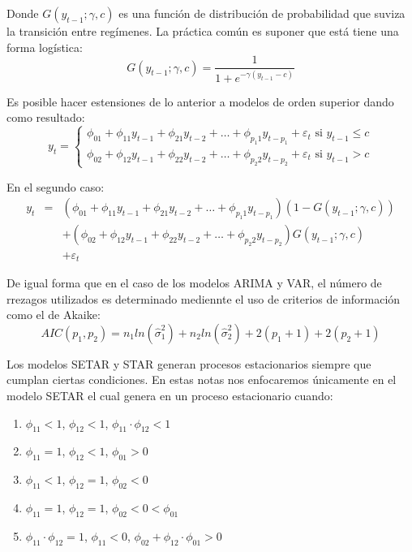 \documentclass[
]{book}
\begin{document}
Donde \(G(y_{t-1}; \gamma, c)\) es una función de distribución de probabilidad que suviza la transición entre regímenes. La práctica común es suponer que está tiene una forma logística:
\begin{equation}
    G(y_{t-1}; \gamma, c) = \frac{1}{1 + e^{-\gamma (y_{t-1} - c)}}
\end{equation}

Es posible hacer estensiones de lo anterior a modelos de orden superior dando como resultado:
\begin{equation}
    y_t = 
    \begin{cases}
        \phi_{01} + \phi_{11} y_{t-1} + \phi_{21} y_{t-2} + \ldots + \phi_{p_1 1} y_{t-p_1} + \varepsilon_t \text{ si } y_{t-1} \leq c \\
        \phi_{02} + \phi_{12} y_{t-1} + \phi_{22} y_{t-2} + \ldots + \phi_{p_2 2} y_{t-p_2} + \varepsilon_t \text{ si } y_{t-1} > c 
    \end{cases}
\end{equation}

En el segundo caso:
\begin{eqnarray*}
    y_t & = & (\phi_{01} + \phi_{11} y_{t-1} + \phi_{21} y_{t-2} + \ldots + \phi_{p_1 1} y_{t-p_1}) (1 - G(y_{t-1}; \gamma, c)) \\
    &  & + (\phi_{02} + \phi_{12} y_{t-1} + \phi_{22} y_{t-2} + \ldots + \phi_{p_2 2} y_{t-p_2}) G(y_{t-1}; \gamma, c) \\
    &  & + \varepsilon_t
\end{eqnarray*}

De igual forma que en el caso de los modelos ARIMA y VAR, el número de rrezagos utilizados es determinado mediennte el uso de criterios de información como el de Akaike:
\begin{equation}
    AIC(p_1, p_2) = n_1 ln(\hat{\sigma}^2_1) + n_2 ln(\hat{\sigma}^2_2) + 2(p_1 + 1) + 2(p_2 + 1)
\end{equation}

Los modelos SETAR y STAR generan procesos estacionarios siempre que cumplan ciertas condiciones. En estas notas nos enfocaremos únicamente en el modelo SETAR el cual genera en un proceso estacionario cuando:

\begin{enumerate}
    \item $\phi_{11} < 1$, $\phi_{12} < 1$, $\phi_{11} \cdot \phi_{12} < 1$
    
    \item $\phi_{11} = 1$, $\phi_{12} < 1$, $\phi_{01} > 0$
    
    \item $\phi_{11} < 1$, $\phi_{12} = 1$, $\phi_{02} < 0$
    
    \item $\phi_{11} = 1$, $\phi_{12} = 1$, $\phi_{02} < 0 < \phi_{01}$
    
    \item $\phi_{11} \cdot \phi_{12} = 1$, $\phi_{11} < 0$, $\phi_{02} + \phi_{12} \cdot \phi_{01} > 0$
\end{enumerate}
\end{document}
